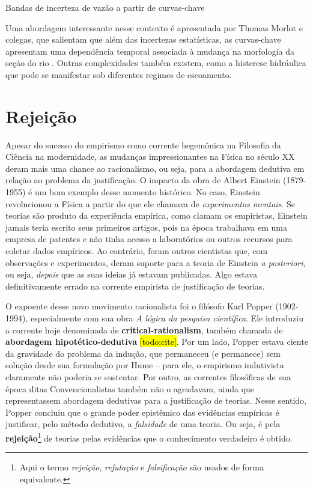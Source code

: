 \documentclass[./main.tex]{subfiles}
\begin{document}
\begin{simplebox}[
    float=htb,
    label={destaque_curvas_chave},
    nameref={Curvas-chave}
    ]{Bandas de incerteza de vazão a partir de curvas-chave}
\begin{minipage}[t]{\linewidth}
    \par Uma abordagem interessante nesse contexto é apresentada por Thomas Morlot e colegas, que salientam que além das incertezas estatísticas, as curvas-chave apresentam uma dependência temporal associada à mudança na morfologia da seção do rio \cite{Morlot2014}. Outras complexidades também existem, como a histerese hidráulica que pode se manifestar sob diferentes regimes de escoamento.    
    \end{minipage}
\label{box:rating-curve}
\normalsize
\end{simplebox}

\section{Rejeição} \label{sec:epis:popper}

\par Apesar do sucesso do empirismo como corrente hegemônica na Filosofia da Ciência na modernidade, as mudanças impressionantes na Física no século XX deram mais uma chance ao racionalismo, ou seja, para a abordagem dedutiva em relação ao problema da justificação. O impacto da obra de Albert Einstein (1879-1955) é um bom exemplo desse momento histórico. No caso, Einstein revolucionou a Física a partir do que ele chamava de \textit{experimentos mentais}. Se teorias são produto da experiência empírica, como clamam os empiristas, Einstein jamais teria escrito seus primeiros artigos, pois na época trabalhava em uma empresa de patentes e não tinha acesso a laboratórios ou outros recursos para coletar dados empíricos. Ao contrário, foram outros cientistas que, com observações e experimentos, deram suporte para a teoria de Einstein \textit{a posteriori}, ou seja, \textit{depois} que as suas ideias já estavam publicadas. Algo estava definitivamente errado na corrente empirista de justificação de teorias.

\par O expoente desse novo movimento racionalista foi o filósofo Karl Popper (1902-1994), especialmente com sua obra \textit{A lógica da pesquisa científica}. Ele introduziu a corrente hoje denominada de \textbf{\gls{critical-rationalism}}, também chamada de \textbf{abordagem hipotético-dedutiva} \hl{[todo:cite]}. Por um lado, Popper estava ciente da gravidade do problema da indução, que permaneceu (e permanece) sem solução desde sua formulação por Hume – para ele, o empirismo indutivista claramente não poderia se sustentar. Por outro, as correntes filosóficas de sua época ditas Convencionalistas também não o agradavam, ainda que representassem abordagem dedutivas para a justificação de teorias. Nesse sentido, Popper concluiu que o grande poder epistêmico das evidências empíricas é justificar, pelo método dedutivo, a \textit{falsidade} de uma teoria. Ou seja, é pela \textbf{rejeição}\footnote{Aqui o termo \textit{rejeição}, \textit{refutação} e \textit{falsificação} são usados de forma equivalente.} de teorias pelas evidências que o conhecimento verdadeiro é obtido.
\end{document}
